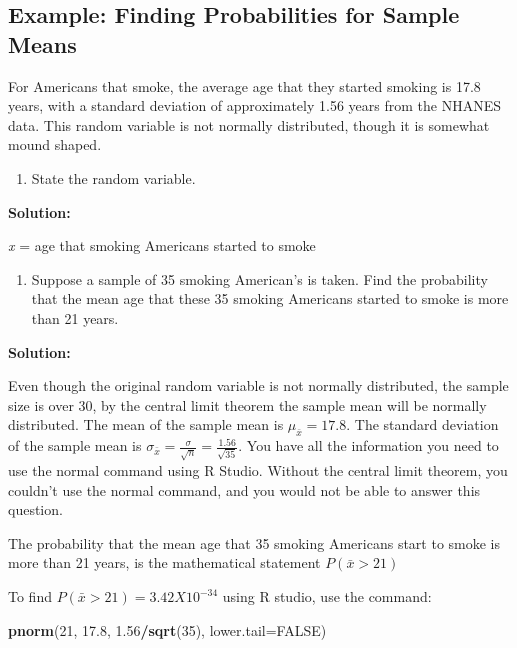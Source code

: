 \documentclass[
]{book}
\newenvironment{Shaded}{\begin{snugshade}}{\end{snugshade}}
\newcommand{\DataTypeTok}[1]{\textcolor[rgb]{0.13,0.29,0.53}{#1}}
\newcommand{\DecValTok}[1]{\textcolor[rgb]{0.00,0.00,0.81}{#1}}
\newcommand{\FloatTok}[1]{\textcolor[rgb]{0.00,0.00,0.81}{#1}}
\newcommand{\KeywordTok}[1]{\textcolor[rgb]{0.13,0.29,0.53}{\textbf{#1}}}
\newcommand{\NormalTok}[1]{#1}
\newcommand{\OperatorTok}[1]{\textcolor[rgb]{0.81,0.36,0.00}{\textbf{#1}}}
\newcommand{\OtherTok}[1]{\textcolor[rgb]{0.56,0.35,0.01}{#1}}
\providecommand{\tightlist}{%
  \setlength{\itemsep}{0pt}\setlength{\parskip}{0pt}}
\begin{document}
\hypertarget{example-finding-probabilities-for-sample-means-1}{%
\subsection{Example: Finding Probabilities for Sample Means}\label{example-finding-probabilities-for-sample-means-1}}

For Americans that smoke, the average age that they started smoking is 17.8 years, with a standard deviation of approximately 1.56 years from the NHANES data. This random variable is not normally distributed, though it is somewhat mound shaped.

\begin{enumerate}
\def\labelenumi{\alph{enumi}.}
\tightlist
\item
  State the random variable.
\end{enumerate}

\textbf{Solution:}

\emph{x} = age that smoking Americans started to smoke

\begin{enumerate}
\def\labelenumi{\alph{enumi}.}
\setcounter{enumi}{1}
\tightlist
\item
  Suppose a sample of 35 smoking American's is taken. Find the probability that the mean age that these 35 smoking Americans started to smoke is more than 21 years.
\end{enumerate}

\textbf{Solution:}

Even though the original random variable is not normally distributed, the sample size is over 30, by the central limit theorem the sample mean will be normally distributed. The mean of the sample mean is \(\mu_{\bar{x}}=17.8\). The standard deviation of the sample mean is \(\sigma_{\bar{x}}=\frac{\sigma}{\sqrt{n}}=\frac{1.56}{\sqrt{35}}\). You have all the information you need to use the normal command using R Studio. Without the central limit theorem, you couldn't use the normal command, and you would not be able to answer this question.

The probability that the mean age that 35 smoking Americans start to smoke is more than 21 years, is the mathematical statement \(P(\bar{x}>21)\)

To find \(P(\bar{x}>21)= 3.42X10^{-34}\) using R studio, use the command:

\begin{Shaded}
\begin{Highlighting}[]
\KeywordTok{pnorm}\NormalTok{(}\DecValTok{21}\NormalTok{, }\FloatTok{17.8}\NormalTok{, }\FloatTok{1.56}\OperatorTok{/}\KeywordTok{sqrt}\NormalTok{(}\DecValTok{35}\NormalTok{), }\DataTypeTok{lower.tail=}\OtherTok{FALSE}\NormalTok{)}
\end{Highlighting}
\end{Shaded}
\end{document}
